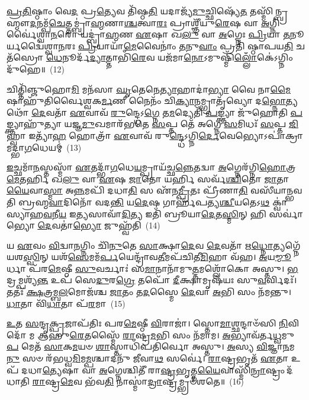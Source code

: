 \-\ul{𑌪𑍍𑌰}\-\-\ul{𑌤𑌿}\-𑌷𑍍𑌠𑌾𑌂 𑌵𑍇\-\ul{𑌦} 𑌪𑍍𑌰\-\ul{𑌤𑍍𑌯𑍇}\-𑌵 𑌤𑌿᳴𑌷𑍍𑌠\-\ul{𑌤𑌿} 𑌯𑌦𑌾𑌜𑍍𑌯᳴\-\ul{𑌮𑍁}\-𑌚𑍍𑌛𑌿𑌷𑍍𑌯𑍇᳴\-\ul{𑌤} 𑌤𑌸𑍍𑌮𑌿᳴𑌨𑍍𑌬𑍍𑌰𑌹𑍍𑌮𑍗\-\ul{𑌦}\-𑌨𑌮𑍍𑌪᳴\-\ul{𑌚𑍇}\-𑌤𑍍𑌤𑌮𑍍𑌬𑍍𑌰𑌾॑\-\ul{𑌹𑍍𑌮}\-𑌣𑌾\-\ul{𑌶𑍍𑌚}\-𑌤𑍍𑌵𑌾\-\ul{𑌰𑌃} 𑌪𑍍𑌰𑌾𑌶𑍍𑌞𑍀᳴𑌯𑍁\-\ul{𑌰𑍇}\-𑌷 𑌵𑌾 \ul{𑌅}\-𑌗𑍍𑌨𑌿𑌰𑍍𑌵𑍈॑𑌶𑍍𑌵𑌾\-\ul{𑌨}\-𑌰𑍋 𑌯𑌦𑍍𑌬𑍍𑌰𑌾॑\-\ul{𑌹𑍍𑌮}\-𑌣 \ul{𑌏}\-𑌷𑌾 𑌖\-\ul{𑌲𑍁} 𑌵𑌾 \ul{𑌅}\-𑌗𑍍𑌨𑍇𑌃 \ul{𑌪𑍍𑌰𑌿}\-𑌯𑌾 \ul{𑌤}\-𑌨𑍂𑌰𑍍𑌯𑌦𑍍𑌵𑍈॑𑌶𑍍𑌵𑌾\-\ul{𑌨}\-𑌰𑌃 \ul{𑌪𑍍𑌰𑌿}\-𑌯𑌾𑌯𑌾᳴\-\ul{𑌮𑍇}\-𑌵𑍈𑌨𑌾𑌂॑ \ul{𑌤}\-𑌨𑍁\-\ul{𑌵𑌾𑌂} 𑌪𑍍𑌰𑌤𑌿᳴ 𑌷𑍍𑌠𑌾𑌪𑌯\-\ul{𑌤𑌿} 𑌚𑌤᳴𑌸𑍍𑌰𑍋 \ul{𑌧𑍇}\-𑌨𑍂𑌰𑍍𑌦᳴\-\ul{𑌦𑍍𑌯𑌾}\-𑌤𑍍𑌤𑌾𑌭𑌿᳴\-\ul{𑌰𑍇}\-𑌵 𑌯𑌜᳴𑌮𑌾\-\ul{𑌨𑍋}\-\-𑌽𑌮𑍁𑌷𑍍𑌮𑌿᳴\-\ul{𑌲𑍍𑌲𑍋𑌁}\-𑌕𑍇॑\-𑌽𑌗𑍍𑌨𑌿𑌂 𑌦𑍁᳴𑌹𑍇॥~(12)

{\anuvakamend[{𑌉\-\ul{𑌪𑍈}\-𑌤𑌾𑌨𑍍𑌧𑌾𑌰𑌾᳴\-\ul{𑌯𑍈} 𑌷𑌟𑍍𑌚᳴𑌤𑍍𑌵𑌾𑌰𑌿𑍞𑌶𑌚𑍍𑌚}]}%

𑌚𑌿𑌤𑍍𑌤𑌿᳴𑌞𑍍𑌜𑍁𑌹𑍋\-\ul{𑌮𑌿} 𑌮𑌨᳴𑌸𑌾 \ul{𑌘𑍃}\-𑌤𑍇𑌨𑍇\-\ul{𑌤𑍍𑌯𑌾}\-𑌹𑌾𑌦𑌾॑\-\ul{𑌭𑍍𑌯𑌾} 𑌵𑍈 𑌨𑌾\-\ul{𑌮𑍈}\-𑌷𑌾𑌹𑍁᳴𑌤𑌿𑌰𑍍𑌵𑍈𑌶𑍍𑌵𑌕\-\ul{𑌰𑍍𑌮}\-𑌣𑍀 𑌨𑍈𑌨𑌂᳴ 𑌚𑌿\-\ul{𑌕𑍍𑌯𑌾}\-𑌨𑌮𑍍𑌭𑍍𑌰𑌾𑌤𑍃᳴𑌵𑍍𑌯𑍋 𑌦\-\ul{𑌭𑍍𑌨𑍋}\-𑌤𑍍𑌯𑌥𑍋᳴ \ul{𑌦𑍇}\-𑌵𑌤𑌾᳴ \ul{𑌏}\-𑌵𑌾𑌵᳴ \ul{𑌰𑍁}\-𑌨𑍍𑌦𑍍𑌧𑍇\-𑌽\-\ul{𑌗𑍍𑌨𑍇} 𑌤\-\ul{𑌮}\-𑌦𑍍𑌯𑍇𑌤𑌿᳴ \ul{𑌪}\-𑌙𑍍𑌕𑍍𑌤𑍍𑌯𑌾 𑌜𑍁᳴𑌹𑍋𑌤𑌿 \ul{𑌪}\-𑌙𑍍𑌕𑍍𑌤𑍍𑌯𑌾𑌹𑍁᳴𑌤𑍍𑌯𑌾 𑌯𑌜𑍍𑌞\-\ul{𑌮𑍁}\-𑌖𑌮𑌾𑌰᳴𑌭𑌤𑍇 \ul{𑌸}\-𑌪𑍍𑌤 𑌤𑍇᳴ 𑌅𑌗𑍍𑌨𑍇 \ul{𑌸}\-𑌮𑌿𑌧𑌃᳴ \ul{𑌸}\-𑌪𑍍𑌤 \ul{𑌜𑌿}\-𑌹𑍍𑌵𑌾 𑌇𑌤𑍍𑌯𑌾᳴\-\ul{𑌹} 𑌹𑍋𑌤𑍍𑌰𑌾᳴ \ul{𑌏}\-𑌵𑌾𑌵᳴ 𑌰𑍁\-\ul{𑌨𑍍𑌦𑍍𑌧𑍇}\-\-𑌽𑌗𑍍𑌨𑌿\-\ul{𑌰𑍍𑌦𑍇}\-𑌵𑍇𑌭𑍍𑌯𑍋\-𑌽𑌪𑌾॑𑌕𑍍𑌰𑌾𑌮𑌦𑍍𑌭𑌾\-\ul{𑌗}\-𑌧𑍇𑌯𑌮𑍍॑~(13)

\-\ul{𑌇}\-𑌚𑍍𑌛𑌮𑌾᳴\-\ul{𑌨}\-𑌸𑍍𑌤𑌸𑍍𑌮𑌾᳴ \ul{𑌏}\-𑌤𑌦𑍍𑌭𑌾᳴\-\ul{𑌗}\-𑌧𑍇\-\ul{𑌯}\-𑌮𑍍𑌪𑍍𑌰𑌾𑌯᳴𑌚𑍍𑌛\-\ul{𑌨𑍍𑌨𑍇}\-𑌤𑌦𑍍𑌵𑌾 \ul{𑌅}\-𑌗𑍍𑌨𑍇𑌰᳴𑌗𑍍𑌨𑌿\-\ul{𑌹𑍋}\-𑌤𑍍𑌰\-\ul{𑌮𑍇}\-𑌤𑌰𑍍\mbox{}\-\ul{𑌹𑌿} 𑌖\-\ul{𑌲𑍁} 𑌵𑌾 \ul{𑌏}\-𑌷 \ul{𑌜𑌾}\-𑌤𑍋 𑌯𑌰𑍍\mbox{}\-\ul{𑌹𑌿} 𑌸𑌰𑍍𑌵᳴\-\ul{𑌶𑍍𑌚𑌿}\-𑌤𑍋 \ul{𑌜𑌾}\-𑌤𑌾\-\ul{𑌯𑍈}\-𑌵𑌾\-\ul{𑌸𑍍𑌮𑌾} 𑌅\-\ul{𑌨𑍍𑌨}\-𑌮𑌪𑌿᳴ 𑌦𑌧𑌾\-\ul{𑌤𑌿} 𑌸 𑌏᳴𑌨\-\ul{𑌮𑍍𑌪𑍍𑌰𑍀}\-𑌤𑌃 𑌪𑍍𑌰𑍀᳴𑌣𑌾\-\ul{𑌤𑌿} 𑌵𑌸𑍀᳴𑌯𑌾𑌨𑍍𑌭𑌵𑌤𑌿 𑌬𑍍𑌰𑌹𑍍𑌮\-\ul{𑌵𑌾}\-𑌦𑌿𑌨𑍋᳴ 𑌵𑌦\-\ul{𑌨𑍍𑌤𑌿} 𑌯\-\ul{𑌦𑍇}\-𑌷 𑌗𑌾𑌰𑍍\mbox{}𑌹᳴𑌪𑌤𑍍𑌯\-\ul{𑌶𑍍𑌚𑍀}\-𑌯𑌤𑍇\-𑌽\-\ul{𑌥} 𑌕𑍍𑌵𑌾॑𑌸𑍍𑌯𑌾𑌹\-\ul{𑌵}\-𑌨𑍀\-\ul{𑌯} 𑌇\-\ul{𑌤𑍍𑌯}\-𑌸𑌾𑌵𑌾᳴\-\ul{𑌦𑌿}\-𑌤𑍍𑌯 𑌇𑌤𑌿᳴ 𑌬𑍍𑌰𑍂𑌯𑌾\-\ul{𑌦𑍇}\-𑌤\-\ul{𑌸𑍍𑌮𑌿}\-𑌨𑍍 𑌹𑌿 𑌸𑌰𑍍𑌵𑌾॑𑌭𑍍𑌯𑍋 \ul{𑌦𑍇}\-𑌵𑌤𑌾॑\-\ul{𑌭𑍍𑌯𑍋} 𑌜𑍁𑌹𑍍𑌵᳴𑌤𑌿~(14)

𑌯 \ul{𑌏}\-𑌵𑌂 \ul{𑌵𑌿}\-𑌦𑍍𑌵𑌾\-\ul{𑌨}\-𑌗𑍍𑌨𑌿𑌂 𑌚𑌿᳴\-\ul{𑌨𑍁}\-𑌤𑍇 \ul{𑌸𑌾}\-𑌕𑍍𑌷𑌾\-\ul{𑌦𑍇}\-𑌵 \ul{𑌦𑍇}\-𑌵𑌤𑌾᳴ 𑌋\-\ul{𑌧𑍍𑌨𑍋}\-𑌤𑍍𑌯𑌗𑍍𑌨𑍇᳴ 𑌯𑌶\-\ul{𑌸𑍍𑌵𑌿}\-𑌨𑍍 𑌯𑌶᳴\-\ul{𑌸𑍇}\-𑌮𑌮᳴\-\ul{𑌰𑍍𑌪}\-𑌯𑍇𑌨𑍍𑌦𑍍𑌰𑌾᳴𑌵\-\ul{𑌤𑍀}\-𑌮𑌪᳴𑌚𑌿𑌤𑍀\-\ul{𑌮𑌿}\-𑌹𑌾 𑌵᳴𑌹। \ul{𑌅}\-𑌯\-\ul{𑌮𑍍𑌮𑍂}\-𑌰𑍍𑌧𑌾 𑌪᳴𑌰\-\ul{𑌮𑍇}\-𑌷𑍍𑌠𑍀 \ul{𑌸𑍁}\-𑌵𑌰𑍍𑌚𑌾𑌃॑ 𑌸\-\ul{𑌮𑌾}\-𑌨𑌾𑌨𑌾᳴𑌮𑍁\-\ul{𑌤𑍍𑌤}\-𑌮𑌶𑍍𑌲𑍋᳴𑌕𑍋 𑌅𑌸𑍍𑌤𑍁। \ul{𑌭}\-𑌦𑍍𑌰𑌮𑍍𑌪𑌶𑍍𑌯᳴\-\ul{𑌨𑍍𑌤} 𑌉𑌪᳴ 𑌸𑍇\-\ul{𑌦𑍁}\-𑌰\-\ul{𑌗𑍍𑌰𑍇} 𑌤𑌪𑍋᳴ \ul{𑌦𑍀}\-𑌕𑍍𑌷𑌾𑌮𑍃𑌷᳴𑌯𑌃 𑌸𑍁\-\ul{𑌵}\-𑌰𑍍𑌵𑌿𑌦𑌃᳴। 𑌤𑌤𑌃᳴ \ul{𑌕𑍍𑌷}\-𑌤𑍍𑌰𑌮𑍍𑌬\-\ul{𑌲}\-𑌮𑍋𑌜᳴𑌶𑍍𑌚 \ul{𑌜𑌾}\-𑌤𑌂 𑌤\-\ul{𑌦}\-𑌸𑍍𑌮𑍈 \ul{𑌦𑍇}\-𑌵𑌾 \ul{𑌅}\-𑌭𑌿 𑌸𑌂 𑌨᳴𑌮𑌨𑍍𑌤𑍁। \ul{𑌧𑌾}\-𑌤𑌾 𑌵𑌿᳴\-\ul{𑌧𑌾}\-𑌤𑌾 𑌪᳴\-\ul{𑌰}\-𑌮𑌾~(15)

\-\ul{𑌉}\-𑌤 \ul{𑌸}\-𑌨𑍍𑌦𑍃\-\ul{𑌕𑍍𑌪𑍍𑌰}\-𑌜𑌾𑌪᳴𑌤𑌿𑌃 𑌪𑌰\-\ul{𑌮𑍇}\-𑌷𑍍𑌠𑍀 \ul{𑌵𑌿}\-𑌰𑌾𑌜𑌾॑। 𑌸𑍍𑌤𑍋\-\ul{𑌮𑌾}\-𑌶𑍍𑌛𑌨𑍍𑌦𑌾𑍞᳴𑌸𑌿 \ul{𑌨𑌿}\-𑌵𑌿𑌦𑍋᳴ 𑌮 𑌆𑌹𑍁\-\ul{𑌰𑍇}\-𑌤𑌸𑍍𑌮𑍈᳴ \ul{𑌰𑌾}\-𑌷𑍍𑌟𑍍𑌰\-\ul{𑌮}\-𑌭𑌿 𑌸𑌂 𑌨᳴𑌮𑌾𑌮। \ul{𑌅}\-𑌭𑍍𑌯𑌾𑌵᳴𑌰𑍍𑌤\-\ul{𑌧𑍍𑌵}\-𑌮𑍁\-\ul{𑌪} 𑌮𑍇𑌤᳴ \ul{𑌸𑌾}\-𑌕\-\ul{𑌮}\-𑌯𑍞 \ul{𑌶𑌾}\-𑌸𑍍𑌤𑌾𑌧𑌿᳴𑌪𑌤𑌿𑌰𑍍𑌵𑍋 𑌅𑌸𑍍𑌤𑍁। \ul{𑌅}\-𑌸𑍍𑌯 \ul{𑌵𑌿}\-𑌜𑍍𑌞𑌾\-\ul{𑌨}\-𑌮\-\ul{𑌨𑍁} 𑌸𑍞 𑌰᳴𑌭𑌧𑍍𑌵\-\ul{𑌮𑌿}\-𑌮\-\ul{𑌮𑍍𑌪}\-𑌶𑍍𑌚𑌾𑌦𑌨𑍁᳴ 𑌜𑍀𑌵𑌾\-\ul{𑌥} 𑌸𑌰𑍍𑌵𑍇॑। \ul{𑌰𑌾}\-𑌷𑍍𑌟𑍍𑌰𑌭𑍃𑌤᳴ \ul{𑌏}\-𑌤𑌾 𑌉𑌪᳴ 𑌦𑌧𑌾\-\ul{𑌤𑍍𑌯𑍇}\-𑌷𑌾 𑌵𑌾 \ul{𑌅}\-𑌗𑍍𑌨𑍇𑌶𑍍𑌚𑌿𑌤𑍀᳴ 𑌰𑌾\-\ul{𑌷𑍍𑌟𑍍𑌰}\-𑌭𑍃𑌤𑍍𑌤\-\ul{𑌯𑍈}\-𑌵𑌾𑌸𑍍𑌮𑌿᳴\-\ul{𑌨𑍍𑌰𑌾}\-𑌷𑍍𑌟𑍍𑌰𑌂 𑌦᳴𑌧𑌾𑌤𑌿 \ul{𑌰𑌾}\-𑌷𑍍𑌟𑍍𑌰\-\ul{𑌮𑍇}\-𑌵 𑌭᳴𑌵\-\ul{𑌤𑌿} 𑌨𑌾𑌸𑍍𑌮𑌾॑\-\ul{𑌦𑍍𑌰𑌾}\-𑌷𑍍𑌟𑍍𑌰𑌮𑍍𑌭𑍍𑌰𑍞᳴𑌶𑌤𑍇॥~(16)


